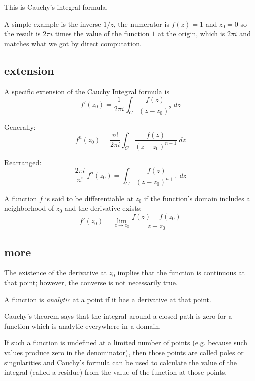 \documentclass[11pt, oneside]{article}
\begin{document}
This is Cauchy's integral formula.

A simple example is the inverse $1/z$, the numerator is $f(z) = 1$ and $z_0 = 0$ so the result is $2 \pi i$ times the value of the function $1$ at the origin, which is $2 \pi i$ and matches what we got by direct computation.

\subsection*{extension}

A specific extension of the Cauchy Integral formula is
\[ f'(z_0) = \frac{1}{2 \pi i} \int_C \frac{f(z)}{(z - z_0)^2} \ dz \]

Generally:
\[ f^n(z_0) = \frac{n!}{2 \pi i} \int_C \frac{f(z)}{(z - z_0)^{n+1}} \ dz \]

Rearranged:
\[ \frac{2 \pi i}{n!} \ f^n(z_0) = \int_C \frac{f(z)}{(z - z_0)^{n+1}} \ dz \]

A function $f$ is said to be differentiable at $z_0$ if the function's domain includes a neighborhood of $z_0$ and the derivative exists:
\[ f'(z_0) = \lim_{z \rightarrow z_0} \frac{f(z) - f(z_0)}{z - z_0} \]

\subsection*{more}

The existence of the derivative at $z_0$ implies that the function is continuous at that point;  however, the converse is not necessarily true.

A function is \emph{analytic} at a point if it has a derivative at that point.

Cauchy's theorem says that the integral around a closed path is zero for a function which is analytic everywhere in a domain.

If such a function is undefined at a limited number of points (e.g. because such values produce zero in the denominator), then those points are called poles or singularities and Cauchy's formula can be used to calculate the value of the integral (called a residue) from the value of the function at those points.
\end{document}
